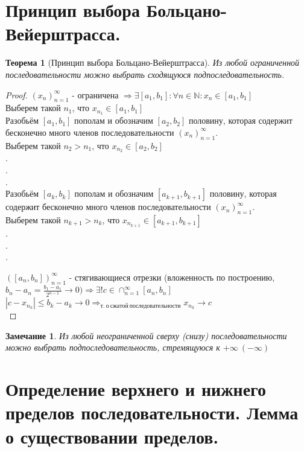 \documentclass[12pt, a4]{article}
\newtheorem*{theorem}{Теорема}
\newtheorem*{remark}{Замечание}
\renewcommand{\implies}{\Rightarrow}
\newcommand{\N}{\mathbb{N}}
\begin{document}
\section{Принцип выбора Больцано-Вейерштрасса.}

\begin{theorem}[Принцип выбора Больцано-Вейерштрасса]
Из любой ограниченной последовательности можно выбрать сходящуюся подпоследовательность.
\end{theorem}

\begin{proof}
$(x_n)_{n=1}^\infty$ - ограничена $\implies \exists [a_1, b_1]: \forall n \in \N: x_n \in [a_1, b_1]$\\
Выберем такой $n_1$, что $x_{n_1} \in [a_1, b_1]$\\
Разобьём $[a_1, b_1]$ пополам и обозначим $[a_2, b_2]$ половину, которая содержит бесконечно много членов последовательности $(x_n)_{n=1}^\infty$.\\
Выберем такой $n_2 > n_1$, что $x_{n_2} \in [a_2, b_2]$\\
.\\
.\\
.\\
Разобьём $[a_k, b_k]$ пополам и обозначим $[a_{k+1}, b_{k+1}]$ половину, которая содержит бесконечно много членов последовательности $(x_n)_{n=1}^\infty$.\\
Выберем такой $n_{k+1} > n_k$, что $x_{n_{k+1}} \in [a_{k+1}, b_{k+1}]$\\
.\\
.\\
.\\
\bigskip

$([a_n, b_n])_{n=1}^\infty$ - стягивающиеся отрезки (вложенность по построению,\\ $b_n - a_n = \frac{b_1-a_1}{2^{n-1}} \to 0) \implies \exists!c \in \cap_{n=1}^\infty[a_n,b_n]$\\
$|c - x_{n_k}| \leq b_k - a_k \to 0 \implies_{т.\ о\ сжатой\ последовательности} x_{n_k} \to c$\\

\end{proof}

\begin{remark}
Из любой неограниченной сверху (снизу) последовательности можно выбрать подпоследовательность, стремящуюся к $+\infty\ (-\infty)$
\end{remark}

\section{Определение верхнего и нижнего пределов последовательности. Лемма о существовании пределов.}
\end{document}
